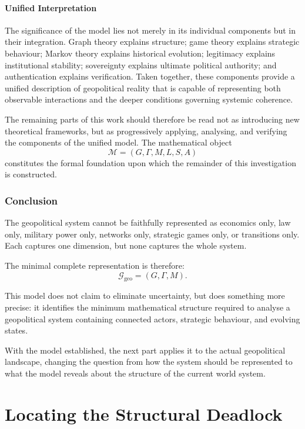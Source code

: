 \documentclass[11pt,openany]{book}
\theoremstyle{plain}
\theoremstyle{definition}
\begin{document}
\subsection*{Unified Interpretation}

The significance of the model lies not merely in its individual components but in their integration. Graph theory explains structure; game theory explains strategic behaviour; Markov theory explains historical evolution; legitimacy explains institutional stability; sovereignty explains ultimate political authority; and authentication explains verification. Taken together, these components provide a unified description of geopolitical reality that is capable of representing both observable interactions and the deeper conditions governing systemic coherence.

The remaining parts of this work should therefore be read not as introducing new theoretical frameworks, but as progressively applying, analysing, and verifying the components of the unified model. The mathematical object
\[
\boxed{
\mathcal{M} = (G,\Gamma,M,L,S,A)
}
\]
constitutes the formal foundation upon which the remainder of this investigation is constructed.

\section*{Conclusion}

The geopolitical system cannot be faithfully represented as economics only, law only, military power only, networks only, strategic games only, or transitions only. Each captures one dimension, but none captures the whole system.

The minimal complete representation is therefore:
\[
\boxed{
\mathcal{G}_{\text{geo}} = (G, \Gamma, M).
}
\]

This model does not claim to eliminate uncertainty, but does something more precise: it identifies the minimum mathematical structure required to analyse a geopolitical system containing connected actors, strategic behaviour, and evolving states.

With the model established, the next part applies it to the actual geopolitical landscape, changing the question from how the system should be represented to what the model reveals about the structure of the current world system.


\part{Locating the Structural Deadlock}
\end{document}
